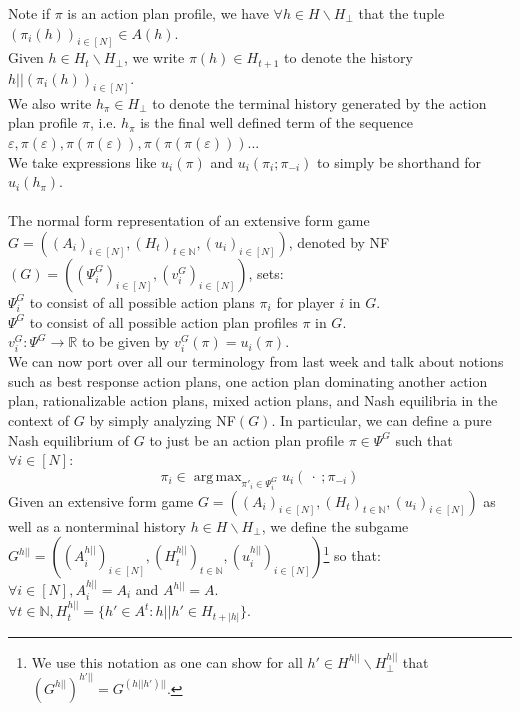 \documentclass[11pt]{article}
\DeclareMathOperator*{\argmax}{arg\,max}
\theoremstyle{definition}
\theoremstyle{plain}
\begin{document}
Note if $\pi$ is an action plan profile, we have $\forall h \in H \backslash H_{\bot}$ that the tuple $(\pi_{i}(h))_{i \in [N]} \in A(h)$.
\\
Given $h \in H_t \backslash H_\bot$, we write $\pi(h) \in H_{t+1}$ to denote the history $h||(\pi_i(h))_{i \in [N]}$.
\\
We also write $h_{\pi} \in H_{\bot}$ to denote the terminal history generated by the action plan profile $\pi$, i.e. $h_{\pi}$ is the final well defined term of the sequence $\varepsilon, \pi(\varepsilon), \pi(\pi(\varepsilon)), \pi(\pi(\pi(\varepsilon)))$...
\\
We take expressions like $u_i(\pi)$ and $u_i(\pi_i;\pi_{-i})$ to simply be shorthand for $u_i(h_{\pi})$.
\\
\\
The normal form representation of an extensive form game $G=((A_i)_{i \in [N]},(H_t)_{t \in \mathbb{N}}, (u_i)_{i \in [N]})$, denoted by NF$(G)=((\Psi^G_i)_{i \in [N]},(v^G_i)_{i \in [N]})$, sets:
\\
 $\Psi^G_i$ to consist of all possible action plans $\pi_i$ for player $i$ in $G$.
 \\
 $\Psi^G$ to consist of all possible action plan profiles $\pi$ in $G$.
 \\
 $v^G_i: \Psi^G \to \mathbb{R}$ to be given by $v^G_i(\pi)=u_i(\pi)$. 
 \\
 We can now port over all our terminology from last week and talk about notions such as best response action plans, one action plan dominating another action plan, rationalizable action plans, mixed action plans, and Nash equilibria in the context of $G$ by simply analyzing NF$(G)$. In particular, we can define a pure Nash equilibrium of $G$ to just be an action plan profile $\pi \in \Psi^G$ such that $\forall i \in [N]$:
 $$\pi_i \in \argmax_{\pi'_i \in \Psi_i^G} u_i(\  \cdot \ ; \pi_{-i})$$
Given an extensive form game $G=((A_i)_{i \in [N]},(H_t)_{t \in \mathbb{N}}, (u_i)_{i \in [N]})$ as well as a nonterminal history $h \in H\backslash H_{\bot}$, we define the subgame $G^{h||}=((A^{h||}_i)_{i \in [N]},(H^{h||}_t)_{t \in \mathbb{N}}, (u^{h||}_i)_{i \in [N]})$\footnote[1]{We use this notation as one can show for all $h' \in H^{h||} \backslash H^{h||}_{\bot}$ that $(G^{h||})^{h'||}=G^{(h||h')||}$.} so that:
\\
$\forall i \in [N], A_i^{h||}=A_i$ and $A^{h||}=A$.
\\
$\forall t \in \mathbb{N}, H^{h||}_t=\{h' \in A^t : h||h' \in H_{t+|h|}\}$.
\\
\end{document}
